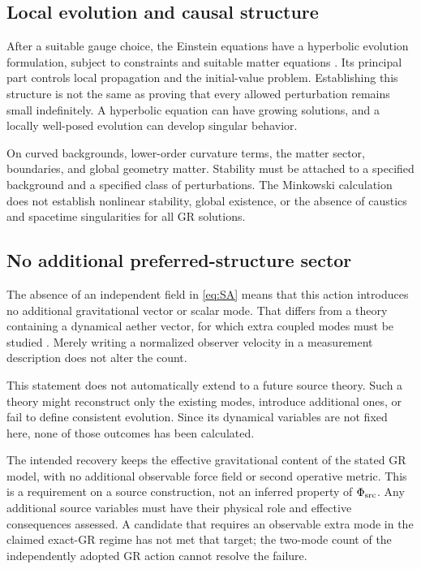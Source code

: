 \documentclass[11pt]{article}
\begin{document}
\subsection{Local evolution and causal structure}
After a suitable gauge choice, the Einstein equations have a hyperbolic evolution formulation, subject to constraints and suitable matter equations \parencite{Gourgoulhon2007}. Its principal part controls local propagation and the initial-value problem. Establishing this structure is not the same as proving that every allowed perturbation remains small indefinitely. A hyperbolic equation can have growing solutions, and a locally well-posed evolution can develop singular behavior.

On curved backgrounds, lower-order curvature terms, the matter sector, boundaries, and global geometry matter. Stability must be attached to a specified background and a specified class of perturbations. The Minkowski calculation does not establish nonlinear stability, global existence, or the absence of caustics and spacetime singularities for all GR solutions.

\subsection{No additional preferred-structure sector}
The absence of an independent \Aflow{} field in \eqref{eq:SA} means that this action introduces no additional gravitational vector or scalar mode. That differs from a theory containing a dynamical aether vector, for which extra coupled modes must be studied \parencite{JacobsonMattingly2004}. Merely writing a normalized observer velocity in a measurement description does not alter the count.

This statement does not automatically extend to a future source theory. Such a theory might reconstruct only the existing modes, introduce additional ones, or fail to define consistent evolution. Since its dynamical variables are not fixed here, none of those outcomes has been calculated.

The intended recovery keeps the effective gravitational content of the stated GR model, with no additional observable force field or second operative metric. This is a requirement on a source construction, not an inferred property of $\Phi_{\mathrm{src}}$. Any additional source variables must have their physical role and effective consequences assessed. A candidate that requires an observable extra mode in the claimed exact-GR regime has not met that target; the two-mode count of the independently adopted GR action cannot resolve the failure.
\end{document}
